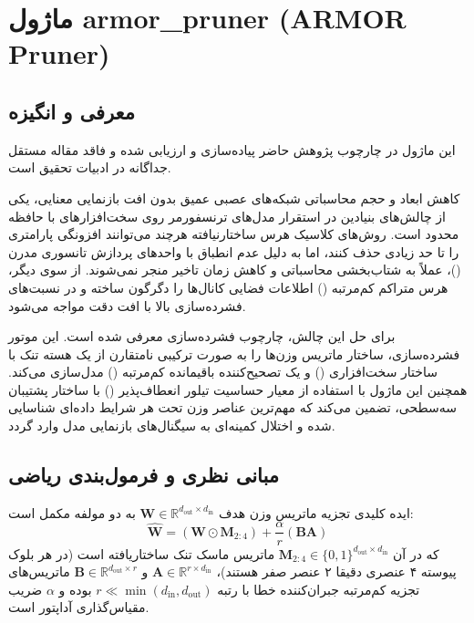 \section{ماژول armor\_pruner (ARMOR Pruner)}
\label{sec:module_armor_pruner}

\subsection{معرفی و انگیزه}
این ماژول در چارچوب پژوهش حاضر پیاده‌سازی و ارزیابی شده و فاقد مقاله مستقل جداگانه در ادبیات تحقیق است.

کاهش ابعاد و حجم محاسباتی شبکه‌های عصبی عمیق بدون افت بازنمایی معنایی، یکی از چالش‌های بنیادین در استقرار مدل‌های ترنسفورمر روی سخت‌افزارهای با حافظه محدود است. روش‌های کلاسیک هرس ساختارنیافته هرچند می‌توانند افزونگی پارامتری را تا حد زیادی حذف کنند، اما به دلیل عدم انطباق با واحدهای پردازش تانسوری مدرن ()، عملاً به شتاب‌بخشی محاسباتی و کاهش زمان تاخیر منجر نمی‌شوند. از سوی دیگر، هرس متراکم کم‌مرتبه () اطلاعات فضایی کانال‌ها را دگرگون ساخته و در نسبت‌های فشرده‌سازی بالا با افت دقت مواجه می‌شود.

برای حل این چالش، چارچوب فشرده‌سازی  معرفی شده است. این موتور فشرده‌سازی، ساختار ماتریس وزن‌ها را به صورت ترکیبی نامتقارن از یک هسته تنک با ساختار سخت‌افزاری  () و یک تصحیح‌کننده باقیمانده کم‌مرتبه () مدل‌سازی می‌کند. همچنین این ماژول با استفاده از معیار حساسیت تیلور انعطاف‌پذیر () با ساختار پشتیبان سه‌سطحی، تضمین می‌کند که مهم‌ترین عناصر وزن تحت هر شرایط داده‌ای شناسایی شده و اختلال کمینه‌ای به سیگنال‌های بازنمایی مدل وارد گردد.

\subsection{مبانی نظری و فرمول‌بندی ریاضی}
ایده کلیدی  تجزیه ماتریس وزن هدف $\mathbf{W} \in \mathbb{R}^{d_{\text{out}} \times d_{\text{in}}}$ به دو مولفه مکمل است:
\begin{equation}
\hat{\mathbf{W}} = (\mathbf{W} \odot \mathbf{M}_{2:4}) + \frac{\alpha}{r} (\mathbf{B} \mathbf{A})
\end{equation}
که در آن $\mathbf{M}_{2:4} \in \{0, 1\}^{d_{\text{out}} \times d_{\text{in}}}$ ماتریس ماسک تنک ساختاریافته  است (در هر بلوک پیوسته ۴ عنصری دقیقا ۲ عنصر صفر هستند)، $\mathbf{A} \in \mathbb{R}^{r \times d_{\text{in}}}$ و $\mathbf{B} \in \mathbb{R}^{d_{\text{out}} \times r}$ ماتریس‌های تجزیه کم‌مرتبه جبران‌کننده خطا با رتبه $r \ll \min(d_{\text{in}}, d_{\text{out}})$ بوده و $\alpha$ ضریب مقیاس‌گذاری آداپتور  است.

